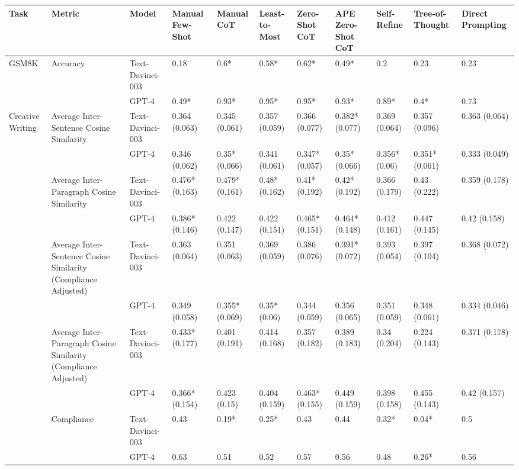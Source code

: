 \begin{tabular}{lllllllllll}
\toprule
Task & Metric & Model & Manual Few-Shot & Manual CoT & Least-to-Most & Zero-Shot CoT & APE Zero-Shot CoT & Self-Refine & Tree-of-Thought & Direct Prompting \\
\midrule
GSM8K & Accuracy & Text-Davinci-003 & 0.18 & 0.6* & 0.58* & 0.62* & 0.49* & 0.2 & 0.23 & 0.23 \\
 &  & GPT-4 & 0.49* & 0.93* & 0.95* & 0.95* & 0.93* & 0.89* & 0.4* & 0.73 \\
Creative Writing & Average Inter-Sentence Cosine Similarity & Text-Davinci-003 & 0.364 (0.063) & 0.345 (0.061) & 0.357 (0.059) & 0.366 (0.077) & 0.382* (0.077) & 0.369 (0.064) & 0.357 (0.096) & 0.363 (0.064) \\
 &  & GPT-4 & 0.346 (0.062) & 0.35* (0.066) & 0.341 (0.061) & 0.347* (0.057) & 0.35* (0.066) & 0.356* (0.06) & 0.351* (0.061) & 0.333 (0.049) \\
 & Average Inter-Paragraph Cosine Similarity & Text-Davinci-003 & 0.476* (0.163) & 0.479* (0.161) & 0.48* (0.162) & 0.41* (0.192) & 0.42* (0.192) & 0.366 (0.179) & 0.43 (0.222) & 0.359 (0.178) \\
 &  & GPT-4 & 0.386* (0.146) & 0.422 (0.147) & 0.422 (0.151) & 0.465* (0.151) & 0.464* (0.148) & 0.412 (0.161) & 0.447 (0.145) & 0.42 (0.158) \\
 & Average Inter-Sentence Cosine Similarity (Compliance Adjusted) & Text-Davinci-003 & 0.363 (0.064) & 0.351 (0.063) & 0.369 (0.059) & 0.386 (0.076) & 0.391* (0.072) & 0.393 (0.054) & 0.397 (0.104) & 0.368 (0.072) \\
 &  & GPT-4 & 0.349 (0.058) & 0.355* (0.069) & 0.35* (0.06) & 0.344 (0.059) & 0.356 (0.065) & 0.351 (0.059) & 0.348 (0.061) & 0.334 (0.046) \\
 & Average Inter-Paragraph Cosine Similarity (Compliance Adjusted) & Text-Davinci-003 & 0.433* (0.177) & 0.401 (0.191) & 0.414 (0.168) & 0.357 (0.182) & 0.389 (0.183) & 0.34 (0.204) & 0.224 (0.143) & 0.371 (0.178) \\
 &  & GPT-4 & 0.366* (0.154) & 0.423 (0.15) & 0.404 (0.159) & 0.463* (0.155) & 0.449 (0.159) & 0.398 (0.158) & 0.455 (0.143) & 0.42 (0.157) \\
 & Compliance & Text-Davinci-003 & 0.43 & 0.19* & 0.25* & 0.43 & 0.44 & 0.32* & 0.04* & 0.5 \\
 &  & GPT-4 & 0.63 & 0.51 & 0.52 & 0.57 & 0.56 & 0.48 & 0.26* & 0.56 \\
\bottomrule
\end{tabular}
